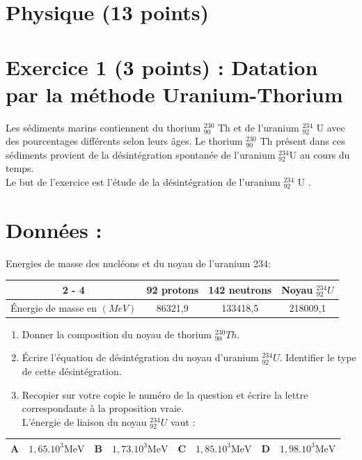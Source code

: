 \section*{Physique (13 points)}
\section*{Exercice 1 (3 points) : Datation par la méthode Uranium-Thorium}
Les sédiments marins contiennent du thorium ${ }_{90}^{230}$ Th et de l'uranium ${ }_{92}^{234}$ U avec des pourcentages différents selon leurs âges. Le thorium ${ }_{90}^{230}$ Th présent dans ces sédiments provient de la désintégration spontanée de l'uranium ${ }_{92}^{234} \mathrm{U}$ au cours du temps.\\
Le but de l'exercice est l'étude de la désintégration de l'uranium ${ }_{92}^{234}$ U .

\section*{Données :}
Energies de masse des nucléons et du noyau de l'uranium 234:

\begin{center}
\begin{tabular}{|c|c|c|c|}
\cline { 2 - 4 }
\multicolumn{1}{c|}{} & 92 protons & 142 neutrons & Noyau ${ }_{92}^{234} U$ \\
\hline
Énergie de masse en $(M e V)$ & 86321,9 & 133418,5 & 218009,1 \\
\hline
\end{tabular}
\end{center}

\begin{enumerate}
  \item Donner la composition du noyau de thorium ${ }_{90}^{230} T h$.
  \item Écrire l'équation de désintégration du noyau d'uranium ${ }_{92}^{234} U$. Identifier le type de cette désintégration.
  \item Recopier sur votre copie le numéro de la question et écrire la lettre correspondante à la proposition vraie.\\
L'énergie de liaison du noyau ${ }_{92}^{234} U$ vaut :
\end{enumerate}

\begin{center}
\begin{tabular}{|c|c|c|c|c|c|c|c|}
\hline
$\mathbf{A}$ & $1,65.10^{3} \mathrm{MeV}$ & $\mathbf{B}$ & $1,73.10^{3} \mathrm{MeV}$ & $\mathbf{C}$ & $1,85.10^{3} \mathrm{MeV}$ & $\mathbf{D}$ & $1,98.10^{3} \mathrm{MeV}$ \\
\hline
\end{tabular}
\end{center}


